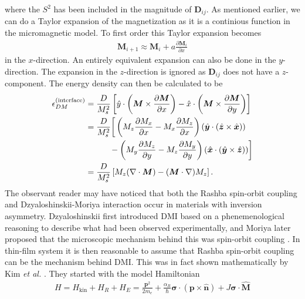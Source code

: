 where the $S^2$ has been included in the magnitude of $\mathbold{D}_{ij}$. As mentioned earlier, we can do a Taylor expansion of the magnetization as it is a continious function in the micromagnetic model. To first order this Taylor expansion becomes
\begin{align}
    \mathbold{M}_{i+1} \approx \mathbold{M}_i + a\frac{\partial\mathbold{M}_i}{\partial x}
\end{align}
in the $x$-direction. An entirely equivalent expansion can also be done in the $y$-direction. The expansion in the $z$-direction is ignored as $\mathbold{D}_{ij}$ does not have a $z$-component. The energy density can then be calculated to be
\begin{subequations}
\begin{align}
\nonumber\epsilon_{DM}^{\textrm{(interface)}} &= 
\frac{D}{M_s^2}\left[\hat{y}\cdot\left(\mathbold{M}\times\frac{\partial\mathbold{M}}{\partial x}\right) - \hat{x}\cdot\left(\mathbold{M}\times\frac{\partial\mathbold{M}}{\partial y}\right)\right] \\
\nonumber&= \frac{D}{M_s^2} \bigg[\left(M_z\frac{\partial M_x}{\partial x} - M_x \frac{\partial M_z}{\partial x}\right)(\mathbold{\hat{y}}\cdot(\mathbold{\hat{z}}\times\mathbold{\hat{x}}))\\
\label{eq:DMInterfaceCrossP}
&\hspace{10.4mm}- \left(M_y\frac{\partial M_z}{\partial y} - M_z \frac{\partial M_y}{\partial y}\right)(\mathbold{\hat{x}}\cdot(\mathbold{\hat{y}}\times\mathbold{\hat{z}}))\bigg] \\
\label{eq:DMInterface}
&= \frac{D}{M_s^2}\left[M_z(\mathbold{\nabla}\cdot\mathbold{M})-(\mathbold{M}\cdot\mathbold{\nabla})M_z\right].
\end{align}
\end{subequations}
The observant reader may have noticed that both the Rashba spin-orbit coupling and Dzyaloshinskii-Moriya interaction occur in materials with inversion asymmetry. Dzyaloshinskii first introduced DMI based on a phenemenological reasoning \citep{Dzyaloshinskii1958} to describe what had been observed experimentally, and Moriya later proposed that the microscopic mechanism behind this was spin-orbit coupling \cite{Moriya1960}. In thin-film system it is then reasonable to assume that Rashba spin-orbit coupling can be the mechanism behind DMI. This was in fact shown mathematically by Kim \textit{et al.} \citep{DMIfromRashba_Kim}. They started with the model Hamiltonian
\begin{align}
H = H_{\textrm{kin}} + H_R + H_E = \frac{\mathbold{p}^2}{2m_e} + \frac{\alpha_R}{\hbar}\mathbold{\sigma}\cdot(\mathbold{p}\times\mathbold{\hat{n}}) + J\mathbold{\sigma}\cdot\mathbold{\hat{M}}
\end{align}
